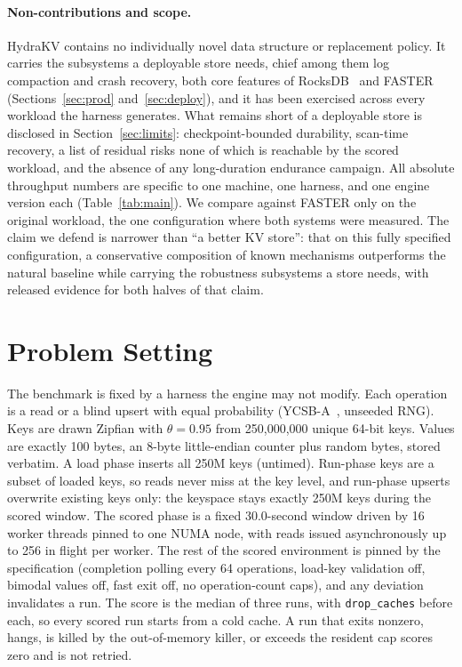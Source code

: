 \documentclass{article}
\newcommand{\NKeys}{250{,}000{,}000}
\newcommand{\NKeysShort}{250M}
\newcommand{\ValueBytes}{100}
\begin{document}
\paragraph{Non-contributions and scope.} HydraKV contains no individually novel data structure or replacement policy. It carries the subsystems a deployable store needs, chief among them log compaction and crash recovery, both core features of RocksDB~\cite{rocksdb} and FASTER (Sections~\ref{sec:prod} and~\ref{sec:deploy}), and it has been exercised across every workload the harness generates. What remains short of a deployable store is disclosed in Section~\ref{sec:limits}: checkpoint-bounded durability, scan-time recovery, a list of residual risks none of which is reachable by the scored workload, and the absence of any long-duration endurance campaign. All absolute throughput numbers are specific to one machine, one harness, and one engine version each (Table~\ref{tab:main}). We compare against FASTER only on the original workload, the one configuration where both systems were measured. The claim we defend is narrower than ``a better KV store'': that on this fully specified configuration, a conservative composition of known mechanisms outperforms the natural baseline while carrying the robustness subsystems a store needs, with released evidence for both halves of that claim.

\section{Problem Setting}
\label{sec:setting}

The benchmark is fixed by a harness the engine may not modify. Each operation is a read or a blind upsert with equal probability (YCSB-A~\cite{ycsb}, unseeded RNG). Keys are drawn Zipfian with $\theta=0.95$ from \NKeys{} unique 64-bit keys. Values are exactly \ValueBytes{} bytes, an 8-byte little-endian counter plus random bytes, stored verbatim. A load phase inserts all \NKeysShort{} keys (untimed). Run-phase keys are a subset of loaded keys, so reads never miss at the key level, and run-phase upserts overwrite existing keys only: the keyspace stays exactly \NKeysShort{} keys during the scored window. The scored phase is a fixed 30.0-second window driven by 16 worker threads pinned to one NUMA node, with reads issued asynchronously up to 256 in flight per worker. The rest of the scored environment is pinned by the specification (completion polling every 64 operations, load-key validation off, bimodal values off, fast exit off, no operation-count caps), and any deviation invalidates a run. The score is the median of three runs, with \texttt{drop\_caches} before each, so every scored run starts from a cold cache. A run that exits nonzero, hangs, is killed by the out-of-memory killer, or exceeds the resident cap scores zero and is not retried.
\end{document}

